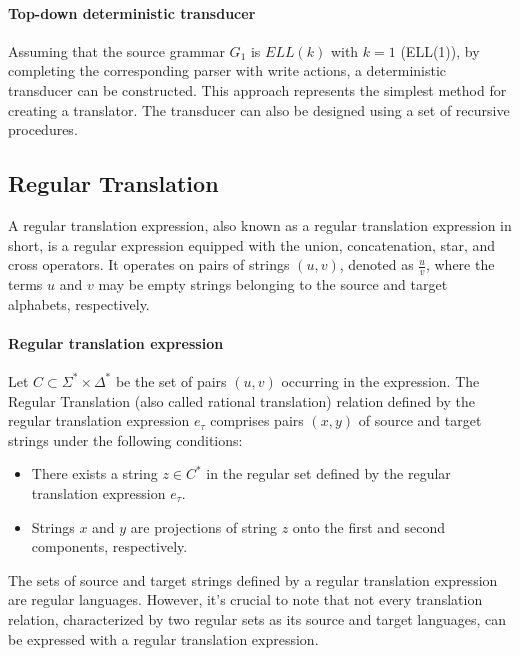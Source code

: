\paragraph*{Top-down deterministic transducer}
Assuming that the source grammar $G_1$ is $\textit{ELL}(k)$ with $k = 1$ (ELL(1)), by completing the corresponding parser with write actions, a deterministic transducer can be constructed.
This approach represents the simplest method for creating a translator. 
The transducer can also be designed using a set of recursive procedures.

\subsection{Regular Translation}
A regular translation expression, also known as a regular translation expression in short, is a regular expression equipped with the union, concatenation, star, and cross operators. It operates on pairs of strings $\left( u, v \right)$, denoted as $\frac{u}{v}$, where the terms $u$ and $v$ may be empty strings belonging to the source and target alphabets, respectively.
\paragraph*{Regular translation expression}
Let $C \subset \Sigma^{\ast} \times \Delta^{\ast}$  be the set of pairs $\left( u, v \right)$ occurring in the expression. The Regular Translation (also called rational translation) relation defined by the regular translation expression $e_\tau$ comprises pairs $\left( x, y \right)$ of source and target strings under the following conditions:
\begin{itemize}
    \item There exists a string $z \in C^{\ast}$ in the regular set defined by the regular translation expression $e_\tau$.
    \item Strings $x$ and $y$ are projections of string $z$ onto the first and second components, respectively.
\end{itemize}
The sets of source and target strings defined by a regular translation expression are regular languages. However, it's crucial to note that not every translation relation, characterized by two regular sets as its source and target languages, can be expressed with a regular translation expression.

